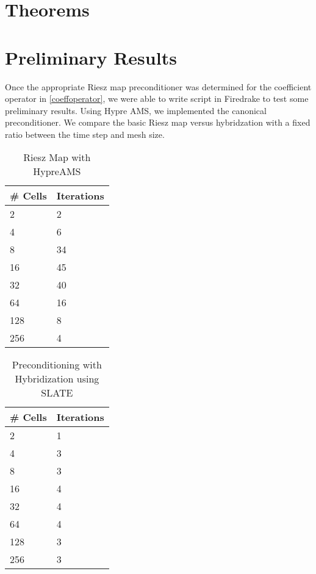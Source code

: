 \documentclass[11pt]{article}
\begin{document}
\section{Theorems}
\section{Preliminary Results}
Once the appropriate Riesz map preconditioner was determined for the coefficient operator in \eqref{coeffoperator}, we were able to write script in Firedrake to test some preliminary results. Using Hypre AMS, we implemented the canonical preconditioner. We compare the basic Riesz map versus hybridzation with a fixed ratio between the time step and mesh size.
\begin{table}[h!]
	\begin{center}
		\caption{Riesz Map with HypreAMS}
		\label{tab:table1}
		\begin{tabular}{l|l}
			\toprule 
			\textbf{\# Cells} & \textbf{Iterations}\\
			\midrule 
			2 & 2 \\
			4 & 6 \\
			8 &34 \\
			16 & 45 \\
			32 & 40 \\
			64 & 16 \\
			128 & 8 \\
			256 & 4 \\
			\bottomrule 
		\end{tabular}
	\end{center}
\end{table}

\begin{table}[h!]
	\begin{center}
		\caption{Preconditioning with Hybridization using SLATE}
		\label{tab:table1}
		\begin{tabular}{l|l}
			\toprule 
			\textbf{\# Cells} & \textbf{Iterations}\\
			\midrule 
			2 & 1 \\
			4 & 3 \\
			8 & 3 \\
			16 & 4 \\
			32 & 4 \\
			64 & 4 \\
			128 & 3 \\
 			256 & 3 \\
			\bottomrule
		\end{tabular}
	\end{center}
\end{table}




 
\end{document}

